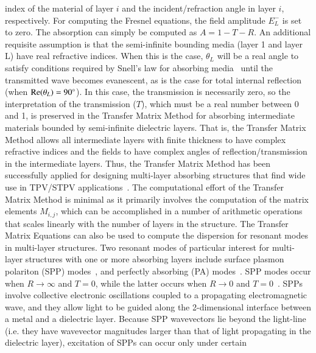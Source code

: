 \documentclass[review]{elsarticle}
\begin{document}
index of the material of layer $i$ and the incident/refraction angle in
layer $i$, respectively.  For computing the Fresnel equations, the field
amplitude $E_L^-$ is set to zero.  The absorption can simply be computed
as $A= 1-T-R$.  An additional requisite assumption is that the
semi-infinite bounding media (layer 1 and layer L) have real refractive
indices.  When this is the case, $\theta_L$ will be a real angle to
satisfy conditions required by Snell's law for absorbing
media~\cite{FMS_ACSPhoton_2014,CWH_JQSRT_2005} until the transmitted wave
becomes evanescent, as is the case for total internal reflection (when
${\rm Re}(\theta_L)=90^{\circ}$).  In this case, the transmission is
necessarily zero, so the interpretation of the transmission ($T$), which
must be a real number between 0 and 1, is preserved in the Transfer Matrix
Method for absorbing intermediate materials bounded by semi-infinite
dielectric layers.  That is, the Transfer Matrix Method allows all
intermediate layers with finite thickness to have complex refractive
indices and the fields to have complex angles of reflection/transmission
in the intermediate layers.  Thus, the Transfer Matrix Method has been
successfully applied for designing multi-layer absorbing structures that
find wide use in TPV/STPV
applications~\cite{BN_JApplPhys_2005,LZ_JApplPhys_2006,FUS_OptExp_2015}.
The computational effort of the Transfer Matrix Method is minimal as it
primarily involves the computation of the matrix elements $M_{i,j}$, which
can be accomplished in a number of arithmetic operations that scales
linearly with the number of layers in the structure.  The Transfer Matrix
Equations can also be used to compute the dispersion for resonant modes in
multi-layer structures.  Two resonant modes of particular interest for
multi-layer structures with one or more absorbing layers include surface
plasmon polariton (SPP)
modes~\cite{WH_PSSb_1987,Maier,Novotny,AP_NatMat_2010,FHR_SciRep_2015},
and perfectly absorbing (PA) modes~\cite{DD_APL_2009,KSL_APL_2012,
KBG_NatMat_2013,FHR_SciRep_2015}.  SPP modes occur when $R \rightarrow
\infty$ and   $T=0$, while the latter occurs when $R \rightarrow 0$ and
$T=0$~\cite{FHR_SciRep_2015}.  SPPs involve collective electronic
oscillations coupled to a propagating electromagnetic wave, and they allow
light to be guided along the 2-dimensional interface between a metal and a
dielectric layer.  Because SPP wavevectors lie beyond the light-line (i.e.
they have wavevector magnitudes larger than that of light propagating in
the dielectric layer), excitation of SPPs can occur only under certain
\end{document}
